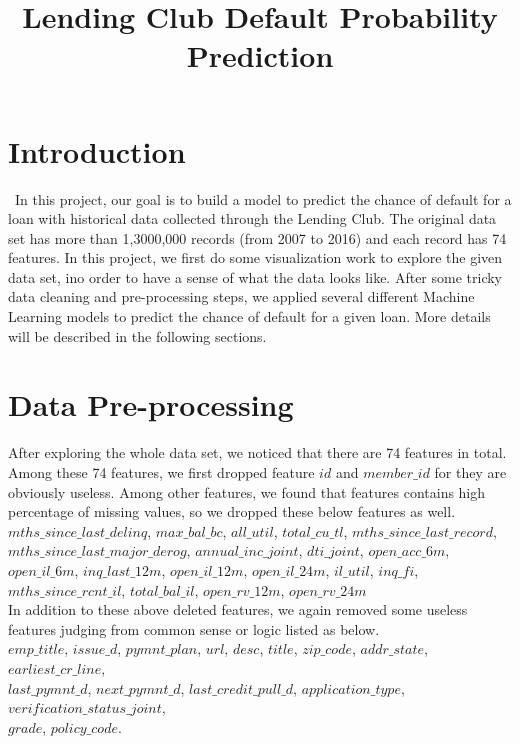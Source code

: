 \documentclass[12pt]{article}
\title{Lending Club Default Probability Prediction}
\begin{document}
%
\maketitle

\section{Introduction}
\quad\ In this project, our goal is to build a model to predict the chance of default for a loan with historical data collected through the Lending Club. The original data set has more than 1,3000,000 records (from 2007 to 2016) and each record has 74 features. In this project, we first do some visualization work to explore the given data set, ino order to have a sense of what the data looks like. After some tricky data cleaning and pre-processing steps, we applied several different Machine Learning models to predict the chance of default for a given loan. More details will be described in the following sections.

\section{Data Pre-processing}
\quad After exploring the whole data set, we noticed that there are 74 features in total. Among these 74 features, we first dropped feature $id$ and $member\_id$ for they are obviously useless. Among other features, we found that features contains high percentage of missing values, so we dropped these below features as well.\\ 

$mths\_since\_last\_delinq$, $ max\_bal\_bc $, $ all\_util $, $ total\_cu\_tl $, $ mths\_since\_last\_record$, \\$ mths\_since\_last\_major\_derog $, $ annual\_inc\_joint $, $ dti\_joint $, $ open\_acc\_6m $, $ open\_il\_6m $, $ inq\_last\_12m $, $ open\_il\_12m $, $ open\_il\_24m $, $ il\_util $, $ inq\_fi $, \\$ mths\_since\_rcnt\_il $, $ total\_bal\_il $, $ open\_rv\_12m $, $ open\_rv\_24m $ \\


In addition to these above deleted features, we again removed some useless features judging from common sense or logic listed as below.\\

$emp\_title$, $issue\_d$, $pymnt\_plan$, $url$, $desc$, $title$, $zip\_code$, $addr\_state$, $earliest\_cr\_line$, \\$last\_pymnt\_d$, $next\_pymnt\_d$, $last\_credit\_pull\_d$, $application\_type$, $verification\_status\_joint$, \\$grade$, $policy\_code$.\\ 
\end{document}
